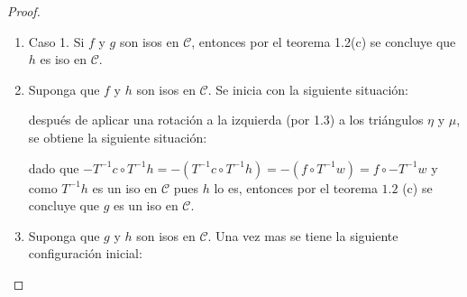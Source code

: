 \documentclass{article}
\begin{document}
\begin{enumerate}[label=\textbf{Ej \arabic*.}]
		\begin{proof}
			\begin{enumerate}
				\item Caso 1. Si $f$ y $g$ son isos en $\mathscr{C}$, entonces por el teorema 1.2(c) se concluye que $h$ es iso en $\mathscr{C}$.
				
				\item Suponga que $f$ y $h$ son isos en $\mathscr{C}$. Se inicia con la siguiente situaci\'on:
				
				\begin{center}
				\end{center}
				
				después de aplicar una rotación a la izquierda (por 1.3) a los triángulos $\eta$ y $\mu$, se obtiene la siguiente situaci\'on:
				
				\begin{center}
				\end{center}
				dado que $-T^{-1}c \circ T^{-1}h=-(T^{-1}c \circ T^{-1}h)=-(f\circ T^{-1}w)=f\circ -T^{-1}w$ y como $T^{-1}h$ es un iso en $\mathscr{C}$ pues $h$ lo es, entonces por el teorema $1.2$ (c) se concluye que $g$ es un iso en $\mathscr{C}$. 
				
				\item Suponga que $g$ y $h$ son isos en $\mathscr{C}$. Una vez mas se tiene la siguiente configuración inicial:
				
				\begin{center}
				\end{center}
				

\end{enumerate}
\end{proof}
\end{enumerate}
\end{document}
